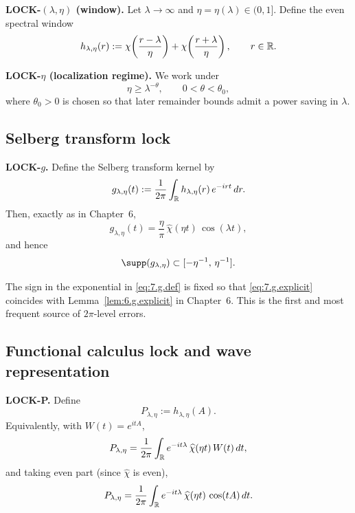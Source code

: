 \medskip
\noindent\textbf{LOCK-$(\lambda,\eta)$ (window).}
Let $\lambda\to\infty$ and $\eta=\eta(\lambda)\in(0,1]$. Define the even spectral window
\begin{equation}\label{eq:7.h.window}
h_{\lambda,\eta}(r):=
\chi\!\left(\frac{r-\lambda}{\eta}\right)+
\chi\!\left(\frac{r+\lambda}{\eta}\right),
\qquad r\in\mathbb{R}.
\end{equation}

\medskip
\noindent\textbf{LOCK-$\eta$ (localization regime).}
We work under
\begin{equation}\label{eq:7.eta.regime}
\eta\ge \lambda^{-\theta},\qquad 0<\theta<\theta_0,
\end{equation}
where $\theta_0>0$ is chosen so that later remainder bounds admit a power saving in $\lambda$.

\subsection{Selberg transform lock}\label{subsec:ch7-glock}

\noindent\textbf{LOCK-$g$.}
Define the Selberg transform kernel by
\begin{equation}\label{eq:7.g.def}
g_{\lambda,\eta}(t):=\frac{1}{2\pi}\int_{\mathbb{R}} h_{\lambda,\eta}(r)\,e^{-irt}\,dr.
\end{equation}
Then, exactly as in Chapter~6,
\begin{equation}\label{eq:7.g.explicit}
g_{\lambda,\eta}(t)=\frac{\eta}{\pi}\,\widehat\chi(\eta t)\,\cos(\lambda t),
\end{equation}
and hence
\begin{equation}\label{eq:7.g.support}
\supp(g_{\lambda,\eta})\subset[-\eta^{-1},\,\eta^{-1}].
\end{equation}

\begin{remark}\label{rem:7.g.consistency}
The sign in the exponential in \eqref{eq:7.g.def} is fixed so that \eqref{eq:7.g.explicit} coincides with
Lemma~\ref{lem:6.g.explicit} in Chapter~6. This is the first and most frequent source of $2\pi$-level errors.
\end{remark}

\subsection{Functional calculus lock and wave representation}\label{subsec:ch7-plock}

\noindent\textbf{LOCK-P.}
Define
\begin{equation}\label{eq:7.P.fc}
P_{\lambda,\eta}:=h_{\lambda,\eta}(A).
\end{equation}
Equivalently, with $W(t)=e^{itA}$,
\begin{equation}\label{eq:7.P.wave.W}
P_{\lambda,\eta}
=\frac{1}{2\pi}\int_{\mathbb{R}} e^{-it\lambda}\,\widehat\chi(\eta t)\,W(t)\,dt,
\end{equation}
and taking even part (since $\widehat\chi$ is even),
\begin{equation}\label{eq:7.P.wave.cos}
P_{\lambda,\eta}
=\frac{1}{2\pi}\int_{\mathbb{R}} e^{-it\lambda}\,\widehat\chi(\eta t)\,\cos(tA)\,dt.
\end{equation}

